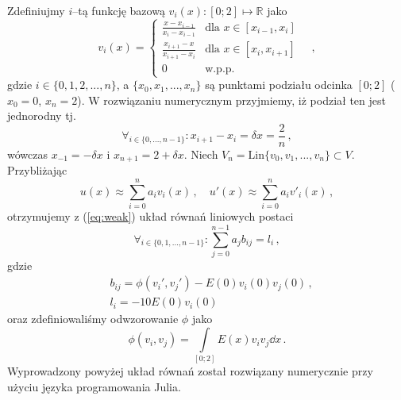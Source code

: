 \documentclass{myclass}
\begin{document}
Zdefiniujmy \(i\)--tą funkcję bazową \(v_i(x):[0;2]\mapsto\mathbb{R}\) jako
\begin{equation}
    v_i(x) = \begin{cases}
        \frac{x-x_{i-1}}{x_i - x_{i-1}}&\text{dla \(x\in [x_{i-1},x_i]\)}\\
        \frac{x_{i+1}-x}{x_{i+1} - x_{i}}&\text{dla \(x\in [x_{i},x_{i+1}]\)}\\
        0&\text{w.p.p.}
    \end{cases}\quad,
\end{equation}
gdzie \(i\in\{0,1,2,...,n\}\), a \(\{x_0,x_1,...,x_n\}\) są punktami podziału
odcinka \([0;2]\) (\(x_0=0\), \(x_n=2\)). W rozwiązaniu numerycznym przyjmiemy,
iż podział ten jest jednorodny tj. 
\begin{equation}
    \forall_{i\in\{0,...,n-1\}}: x_{i+1}-x_{i} = \delta x = \frac{2}{n}\,,
\end{equation}
wówczas \(x_{-1}=-\delta x\) i \(x_{n+1}=2+\delta x\). Niech
\(V_n=\text{Lin}\{v_0,v_1,...,v_n\} \subset V\). Przybliżając
\begin{equation}
    u(x)\approx \sum_{i=0}^na_iv_i(x)\,,\quad u'(x)\approx \sum_{i=0}^na_iv'_i(x)\,,
\end{equation}
otrzymujemy z (\ref{eq:weak}) układ równań liniowych postaci
\begin{equation}
    \forall_{i\in\{0,1,...,n-1\}}: \sum_{j=0}^{n-1} a_jb_{ij} = l_i\,,
\end{equation}
gdzie 
\begin{equation}
    \begin{split}
        &b_{ij} = \phi(v_i',v_j')-E(0)v_i(0)v_j(0)\,,\\
        &l_i =-10E(0)v_i(0)
    \end{split}
\end{equation}
oraz zdefiniowaliśmy odwzorowanie \(\phi\) jako
\begin{equation}
    \phi(v_i,v_j)=\int\limits_{[0;2]}E(x)v_iv_j\dd{x}\,.
\end{equation}
Wyprowadzony powyżej układ równań został rozwiązany numerycznie przy użyciu
języka programowania Julia.
\end{document}
